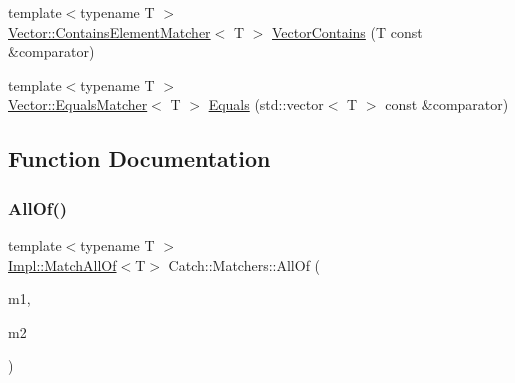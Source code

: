 \begin{DoxyCompactItemize}
\item 
{\footnotesize template$<$typename T $>$ }\\\mbox{\hyperlink{struct_catch_1_1_matchers_1_1_vector_1_1_contains_element_matcher}{Vector\+::\+Contains\+Element\+Matcher}}$<$ T $>$ \mbox{\hyperlink{namespace_catch_1_1_matchers_ae8db5846328116fb36386893deaec944}{Vector\+Contains}} (T const \&comparator)
\item 
{\footnotesize template$<$typename T $>$ }\\\mbox{\hyperlink{struct_catch_1_1_matchers_1_1_vector_1_1_equals_matcher}{Vector\+::\+Equals\+Matcher}}$<$ T $>$ \mbox{\hyperlink{namespace_catch_1_1_matchers_a332a401fb0da33c988e9cfa400ecce1b}{Equals}} (std\+::vector$<$ T $>$ const \&comparator)
\end{DoxyCompactItemize}


\subsection{Function Documentation}
\mbox{\label{namespace_catch_1_1_matchers_ac690851ef8a0a27206cd9cb10e3c2b18}} 
\subsubsection{\texorpdfstring{All\+Of()}{AllOf()}\hspace{0.1cm}{\footnotesize\ttfamily [1/2]}}
{\footnotesize\ttfamily template$<$typename T $>$ \\
\mbox{\hyperlink{struct_catch_1_1_matchers_1_1_impl_1_1_match_all_of}{Impl\+::\+Match\+All\+Of}}$<$T$>$ Catch\+::\+Matchers\+::\+All\+Of (\begin{DoxyParamCaption}\item[{\mbox{\hyperlink{struct_catch_1_1_matchers_1_1_impl_1_1_matcher_base}{Impl\+::\+Matcher\+Base}}$<$ T $>$ const \&}]{m1,  }\item[{\mbox{\hyperlink{struct_catch_1_1_matchers_1_1_impl_1_1_matcher_base}{Impl\+::\+Matcher\+Base}}$<$ T $>$ const \&}]{m2 }\end{DoxyParamCaption})\hspace{0.3cm}{\ttfamily [inline]}}

\mbox{\label{namespace_catch_1_1_matchers_a9cf3bef1efd3453f2528bb16d1ec5048}} 
